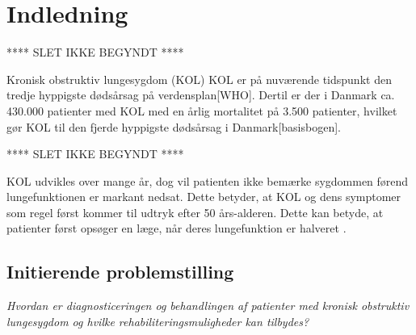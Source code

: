 \chapter{Indledning}
 
 **** SLET IKKE BEGYNDT ****

Kronisk obstruktiv lungesygdom (KOL)
KOL er på nuværende tidspunkt den tredje hyppigste dødsårsag på verdensplan[WHO]. Dertil er der i Danmark ca. 430.000 patienter med KOL med en årlig mortalitet på 3.500 patienter, hvilket gør KOL til den fjerde hyppigste dødsårsag i Danmark[basisbogen].


 **** SLET IKKE BEGYNDT ****

KOL udvikles over mange år, dog vil patienten ikke bemærke sygdommen førend lungefunktionen er markant nedsat. Dette betyder, at KOL og dens symptomer som regel først kommer til udtryk efter 50 års-alderen\cite{Lange2015}. Dette kan betyde, at patienter først opsøger en læge, når deres lungefunktion er halveret \cite{dsam2016}. 


\section{Initierende problemstilling}
\textit{Hvordan er diagnosticeringen og behandlingen af patienter med kronisk obstruktiv lungesygdom og hvilke rehabiliteringsmuligheder kan tilbydes?}